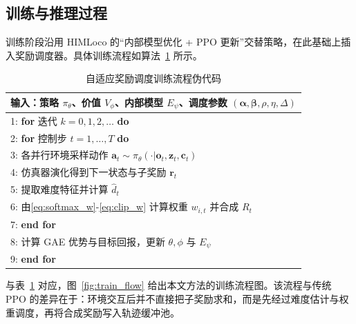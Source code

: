 \documentclass[12pt,a4paper]{ctexart}
\numberwithin{equation}{section}
\numberwithin{table}{section}
\numberwithin{figure}{section}
\newcommand{\subtopic}[1]{\par\addvspace{0.2\baselineskip}\ignorespaces}
\begin{document}
\subsection{训练与推理过程}
\subtopic{训练流程}
训练阶段沿用 HIMLoco 的“内部模型优化 + PPO 更新”交替策略，在此基础上插入奖励调度器。具体训练流程如算法~\ref{alg:train} 所示。

\begin{table}[H]
\centering
\caption{自适应奖励调度训练流程伪代码}
\label{alg:train}
\begin{tabular}{l}
\toprule
\textbf{输入}：策略 $\pi_\theta$、价值 $V_\phi$、内部模型 $E_\psi$、调度参数 $(\bm{\alpha},\bm{\beta},\rho,\eta,\Delta)$ \\
\midrule
1: \textbf{for} 迭代 $k=0,1,2,\dots$ \textbf{do} \\
2: \quad \textbf{for} 控制步 $t=1,\dots,T$ \textbf{do} \\
3: \quad\quad 各并行环境采样动作 $\bm{a}_t\sim\pi_\theta(\cdot|\bm{o}_t,\bm{z}_t,\bm{c}_t)$ \\
4: \quad\quad 仿真器演化得到下一状态与子奖励 $\bm{r}_t$ \\
5: \quad\quad 提取难度特征并计算 $\hat{d}_t$ \\
6: \quad\quad 由\eqref{eq:softmax_w}-\eqref{eq:clip_w} 计算权重 $w_{i,t}$ 并合成 $R_t$ \\
7: \quad \textbf{end for} \\
8: \quad 计算 GAE 优势与目标回报，更新 $\theta,\phi$ 与 $E_\psi$ \\
9: \textbf{end for} \\
\bottomrule
\end{tabular}
\end{table}

与表~\ref{alg:train} 对应，图~\ref{fig:train_flow} 给出本文方法的训练流程图。该流程与传统 PPO 的差异在于：环境交互后并不直接把子奖励求和，而是先经过难度估计与权重调度，再将合成奖励写入轨迹缓冲池。
\end{document}
